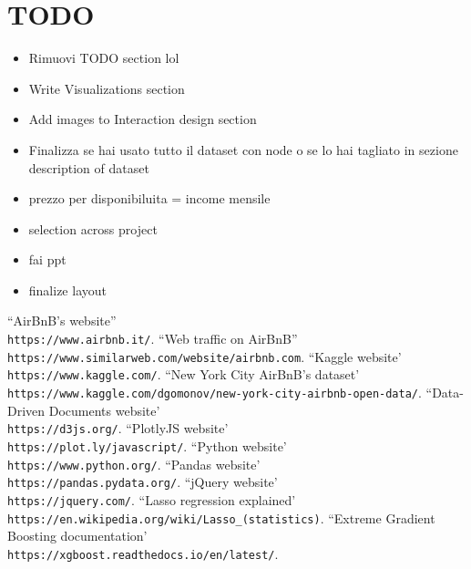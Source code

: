 \documentclass[11pt]{article}
\begin{document}
\section{TODO}
\begin{itemize}
\item Rimuovi TODO section lol
\item Write Visualizations section
\item Add images to Interaction design section
\item Finalizza se hai usato tutto il dataset con node o se lo hai tagliato in sezione description of dataset
\item prezzo per disponibiluita = income mensile
\item selection across project
\item fai ppt
\item finalize layout
\end{itemize}


\newpage
\begin{thebibliography}{10}
``AirBnB's website'' \\
  \verb|https://www.airbnb.it/|.
``Web traffic on AirBnB'' \\
  \verb|https://www.similarweb.com/website/airbnb.com|.
``Kaggle website' \\
  \verb|https://www.kaggle.com/|.
``New York City AirBnB's dataset' \\
  \verb|https://www.kaggle.com/dgomonov/new-york-city-airbnb-open-data/|.
``Data-Driven Documents website' \\
  \verb|https://d3js.org/|.
``PlotlyJS website' \\
  \verb|https://plot.ly/javascript/|.
``Python website' \\
  \verb|https://www.python.org/|.
``Pandas website' \\
  \verb|https://pandas.pydata.org/|.
``jQuery website' \\
  \verb|https://jquery.com/|.
``Lasso regression explained' \\
  \verb|https://en.wikipedia.org/wiki/Lasso_(statistics)|.
``Extreme Gradient Boosting documentation' \\
  \verb|https://xgboost.readthedocs.io/en/latest/|.
\end{thebibliography}
\end{document}
